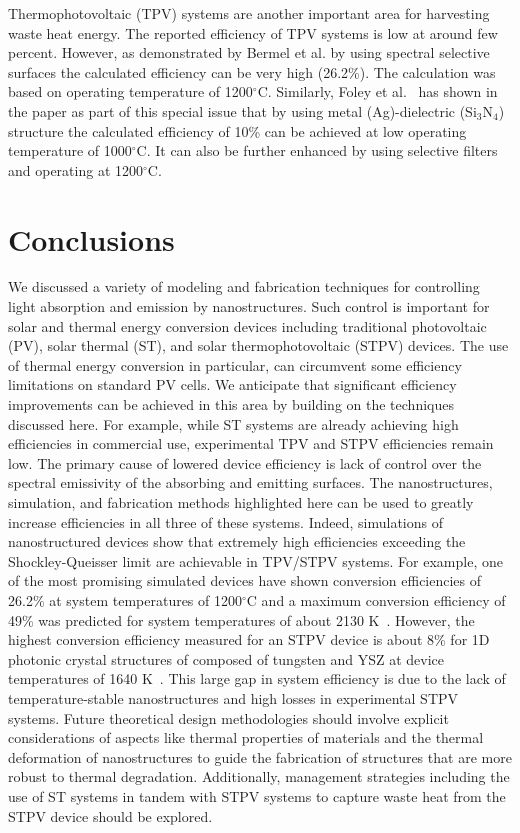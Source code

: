 \documentclass[review]{elsarticle}
\begin{document}
Thermophotovoltaic (TPV) systems are another important area for harvesting waste heat energy. The reported efficiency of TPV systems is low at around few percent. However, as demonstrated by Bermel et al. \cite{g4} by using spectral selective surfaces the calculated efficiency can be  very high (26.2\%). The calculation was based on operating temperature of 1200$^\circ$C. Similarly, Foley et al.~\cite{FUS_OptExp_2015} has shown in the paper as part of this special issue that by using metal (Ag)-dielectric (Si$_3$N$_4$) structure the calculated  efficiency of 10\% can be achieved at low operating temperature of 1000$^{\circ}$C.  It can also be further enhanced by using selective filters and operating at 1200$^\circ$C. 

\section{Conclusions}
We discussed a variety of modeling and fabrication techniques for controlling light 
absorption and emission by nanostructures.   Such control is important for solar and 
thermal energy conversion devices including traditional photovoltaic (PV), 
solar thermal (ST), and solar thermophotovoltaic (STPV) devices. 
The use of thermal energy conversion in particular, 
can circumvent some efficiency limitations on standard PV cells.  We 
anticipate that significant efficiency improvements can be achieved in this area 
by building on the techniques discussed here.  For example, while ST systems 
are already achieving high efficiencies in commercial use, experimental 
TPV and STPV efficiencies remain low.  The primary cause of lowered device 
efficiency is lack of control over the spectral emissivity of the 
absorbing and emitting surfaces.  The nanostructures, simulation, and 
fabrication methods highlighted here can be used to greatly increase 
efficiencies in all three of these systems.  
Indeed, simulations of nanostructured devices show that extremely high efficiencies 
exceeding the Shockley-Queisser limit are achievable in TPV/STPV systems.
For example, one of the most promising simulated devices have shown conversion efficiencies of 26.2\% at 
system temperatures of 1200$^\circ$C and a maximum conversion efficiency of 49\% was predicted for system 
temperatures of about 2130 K~\cite{RF_OptExp_2009}.  However, the highest conversion efficiency measured
for an STPV device is about 8\% for 1D photonic crystal structures of composed of tungsten and YSZ at 
device temperatures of 1640 K~\cite{SKY_JPE_2015}.  This large gap in system efficiency is due to the lack of temperature-stable 
nanostructures and high losses in experimental STPV systems.  Future theoretical design methodologies should involve
explicit considerations of aspects like thermal properties of materials and the thermal deformation of 
nanostructures to guide the fabrication of structures that are more robust to thermal degradation.    
Additionally, management strategies including the use of ST systems in tandem with STPV systems to capture waste heat from the STPV device
should be explored.
\end{document}
